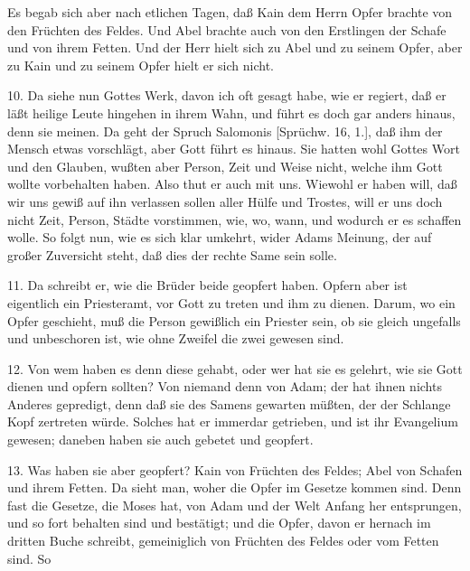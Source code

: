 Es begab sich aber nach etlichen Tagen, daß Kain dem Herrn Opfer brachte von den Früchten des Feldes. Und Abel brachte auch von den Erstlingen der Schafe und von ihrem Fetten. Und der Herr hielt sich zu Abel und zu seinem Opfer, aber zu Kain und zu seinem Opfer hielt er sich nicht.

10. Da siehe nun Gottes Werk, davon ich oft gesagt habe, wie er regiert, daß er läßt heilige Leute hingehen in ihrem Wahn, und führt es doch gar anders hinaus, denn sie meinen. Da geht der Spruch Salomonis [Sprüchw. 16, 1.], daß ihm der Mensch etwas vorschlägt, aber Gott führt es hinaus. Sie hatten wohl Gottes Wort und den Glauben, wußten aber Person, Zeit und Weise nicht, welche ihm Gott wollte vorbehalten haben. Also thut er auch mit uns. Wiewohl er haben will, daß wir uns gewiß auf ihn verlassen sollen aller Hülfe und Trostes, will er uns doch nicht Zeit, Person, Städte vorstimmen, wie, wo, wann, und wodurch er es schaffen wolle. So folgt nun, wie es sich klar umkehrt, wider Adams Meinung, der auf großer Zuversicht steht, daß dies der rechte Same sein solle.

11. Da schreibt er, wie die Brüder beide geopfert haben. Opfern aber ist eigentlich ein Priesteramt, vor Gott zu treten und ihm zu dienen. Darum, wo ein Opfer geschieht, muß die Person gewißlich ein Priester sein, ob sie gleich ungefalls und unbeschoren ist, wie ohne Zweifel die zwei gewesen sind.

12. Von wem haben es denn diese gehabt, oder wer hat sie es gelehrt, wie sie Gott dienen und opfern sollten? Von niemand denn von Adam; der hat ihnen nichts Anderes gepredigt, denn daß sie des Samens gewarten müßten, der der Schlange Kopf zertreten würde. Solches hat er immerdar getrieben, und ist ihr Evangelium gewesen; daneben haben sie auch gebetet und geopfert.

13. Was haben sie aber geopfert? Kain von Früchten des Feldes; Abel von Schafen und ihrem Fetten. Da sieht man, woher die Opfer im Gesetze kommen sind. Denn fast die Gesetze, die Moses hat, von Adam und der Welt Anfang her entsprungen, und so fort behalten sind und bestätigt; und die Opfer, davon er hernach im dritten Buche schreibt, gemeiniglich von Früchten des Feldes oder vom Fetten sind. So
